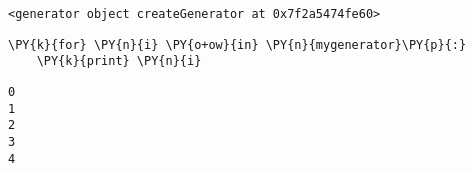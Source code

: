 \par\vspace{1\smallerfontscale}%
    \begin{addmargin}[\cellleftmargin]{0em}%
    {\smaller%
    \vspace{-1\smallerfontscale}%
    
    \begin{Verbatim}[commandchars=\\\{\}]
<generator object createGenerator at 0x7f2a5474fe60>
    \end{Verbatim}
}%
    \end{addmargin}%

{\par%
\vspace{-1\baselineskip}%
}%
\begin{notebookcell}[9]%
\begin{addmargin}[\cellleftmargin]{0em}%
{\smaller%
\par%
%
\vspace{-1\smallerfontscale}%
\begin{Verbatim}[commandchars=\\\{\}]
\PY{k}{for} \PY{n}{i} \PY{o+ow}{in} \PY{n}{mygenerator}\PY{p}{:}
    \PY{k}{print} \PY{n}{i}
\end{Verbatim}
%
\par%
\vspace{-1\smallerfontscale}}%
\end{addmargin}
\end{notebookcell}

\par\vspace{1\smallerfontscale}%
    \begin{addmargin}[\cellleftmargin]{0em}%
    {\smaller%
    \vspace{-1\smallerfontscale}%
    
    \begin{Verbatim}[commandchars=\\\{\}]
0
1
2
3
4
    \end{Verbatim}
}%
    \end{addmargin}%

